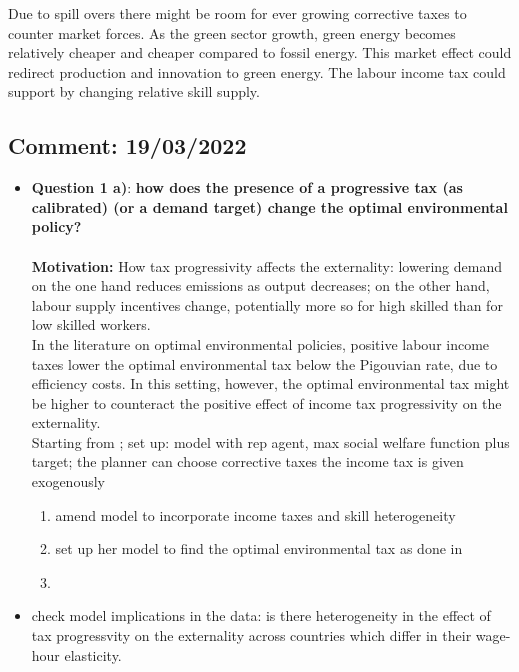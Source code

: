 Due to spill overs there might be room for ever growing corrective taxes to counter market forces. 
As the green sector growth, green energy becomes relatively cheaper and cheaper compared to fossil energy. This market effect could redirect production and innovation to green energy. 
The labour income tax could support by changing relative skill supply. 

\subsection*{Comment: 19/03/2022}
\begin{itemize}

	\item \textbf{Question 1 a)}: \textbf{how does the presence of a progressive tax (as calibrated) (or a demand target) change the optimal environmental policy?}\\ \ \\
\textbf{Motivation:} How tax progressivity affects the externality: lowering demand on the one hand reduces emissions as output decreases; on the other hand, labour supply incentives change, potentially more so for high skilled than for low skilled workers.\\
In the literature on optimal environmental policies, positive labour income taxes lower the optimal environmental tax below the Pigouvian rate, due to efficiency costs. In this setting, however, the optimal environmental tax might be higher to counteract the positive effect of income tax progressivity on the externality. \\
Starting from \cite{Fried2018ClimateAnalysis}; set up:  model with rep agent, max social welfare function plus target;  the planner can choose corrective taxes the income tax is given exogenously
\begin{enumerate}
	\item amend model to incorporate income taxes and skill heterogeneity
\item set up her model to find the optimal environmental tax as done in \cite{Barrage2019OptimalPolicy}
\item 
\end{enumerate}
\item[\ar] check model implications in the data: is there heterogeneity in the effect of tax progressvity on the externality across countries which differ in their wage-hour elasticity. 


\end{itemize}
